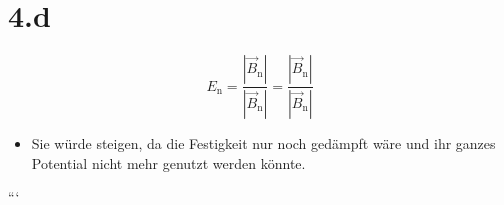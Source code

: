 \section*{4.d}
\[
E_{\text{n}} = \frac{| \vec{B}_{\text{n}} |}{| \vec{B}_{\text{n}} |} = \frac{| \vec{B}_{\text{n}} |}{| \vec{B}_{\text{n}} |}
\]

\begin{itemize}
    \item Sie würde steigen, da die Festigkeit nur noch gedämpft wäre und ihr ganzes Potential nicht mehr genutzt werden könnte.
\end{itemize}

```